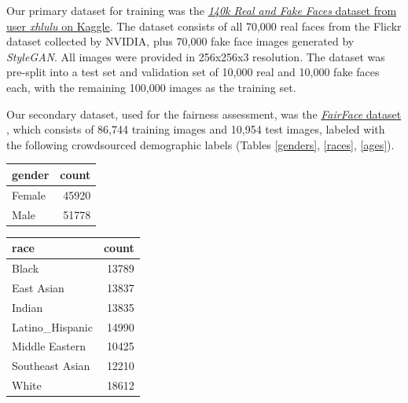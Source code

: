 \documentclass[11pt, letterpaper]{article}
\newenvironment{Figure}
  {\par\medskip\noindent\minipage{\linewidth}}
  {\endminipage\par\medskip}
\begin{document}
\begin{multicols}{2}
  Our primary dataset for training was the
  \href{https://www.kaggle.com/xhlulu/140k-real-and-fake-faces}{\emph{140k
    Real and Fake Faces} dataset from user \emph{xhlulu} on
  Kaggle}. The dataset consists of all 70,000 real faces from the
  Flickr dataset collected by NVIDIA, plus 70,000 fake face images
  generated by \emph{StyleGAN}. All images were provided in 256x256x3
  resolution. The dataset was pre-split into a test set and validation set
  of 10,000 real and 10,000 fake faces each, with the remaining 100,000
  images as the training set.

  Our secondary dataset, used for the fairness assessment, was the
  \href{https://github.com/joojs/fairface}{\emph{FairFace} dataset}
  \cite{karkkainen2019fairface}, which consists of 86,744 training
  images and 10,954 test images, labeled with the following
  crowdsourced demographic labels (Tables \ref{genders}, \ref{races},
  \ref{ages}).

  \begin{Figure}
    \label{genders}
  \begin{tabular}{lr}
    \toprule
        gender &  count  \\
        \midrule
        Female &  45920 \\
        Male   &  51778 \\
        \bottomrule
  \end{tabular}
  \end{Figure}

  \begin{Figure}
    \label{races}
  \begin{tabular}{lr}
    \toprule
        race            &  count \\
        \midrule
        Black           &  13789 \\
        East Asian      &  13837 \\
        Indian          &  13835 \\
        Latino\_Hispanic &  14990 \\
        Middle Eastern  &  10425 \\
        Southeast Asian &  12210 \\
        White           &  18612 \\
        \bottomrule
  \end{tabular}
  \end{Figure}


\end{multicols}
\end{document}
